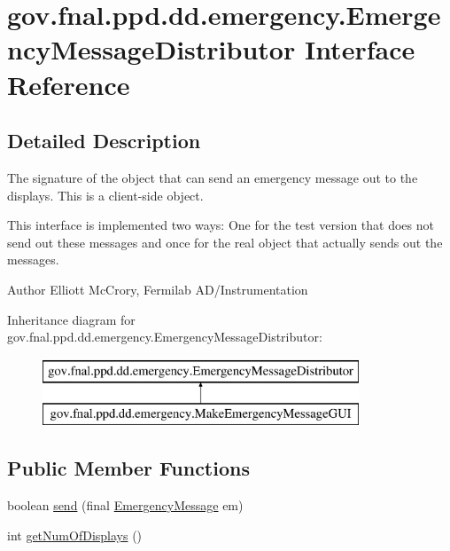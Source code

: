 \hypertarget{interfacegov_1_1fnal_1_1ppd_1_1dd_1_1emergency_1_1EmergencyMessageDistributor}{\section{gov.\-fnal.\-ppd.\-dd.\-emergency.\-Emergency\-Message\-Distributor Interface Reference}
\label{interfacegov_1_1fnal_1_1ppd_1_1dd_1_1emergency_1_1EmergencyMessageDistributor}
}


\subsection{Detailed Description}
The signature of the object that can send an emergency message out to the displays. This is a client-\/side object.

This interface is implemented two ways\-: One for the test version that does not send out these messages and once for the real object that actually sends out the messages.

\begin{DoxyAuthor}{Author}
Elliott Mc\-Crory, Fermilab A\-D/\-Instrumentation 
\end{DoxyAuthor}
Inheritance diagram for gov.\-fnal.\-ppd.\-dd.\-emergency.\-Emergency\-Message\-Distributor\-:\begin{figure}[H]
\begin{center}
\leavevmode
\includegraphics[height=2.000000cm]{interfacegov_1_1fnal_1_1ppd_1_1dd_1_1emergency_1_1EmergencyMessageDistributor}
\end{center}
\end{figure}
\subsection*{Public Member Functions}
\begin{DoxyCompactItemize}
\item 
boolean \hyperlink{interfacegov_1_1fnal_1_1ppd_1_1dd_1_1emergency_1_1EmergencyMessageDistributor_aa67e1816eaa0182a8329bce2c1cd6a7a}{send} (final \hyperlink{classgov_1_1fnal_1_1ppd_1_1dd_1_1emergency_1_1EmergencyMessage}{Emergency\-Message} em)
\item 
int \hyperlink{interfacegov_1_1fnal_1_1ppd_1_1dd_1_1emergency_1_1EmergencyMessageDistributor_ae944177d6e61dbea576b27ce2b76f1d9}{get\-Num\-Of\-Displays} ()
\end{DoxyCompactItemize}


